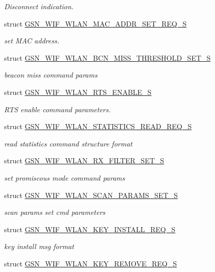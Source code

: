 \begin{DoxyCompactItemize}
\begin{DoxyCompactList}\small\item\em Disconnect indication. \end{DoxyCompactList}\item 
struct \hyperlink{a00388}{GSN\_\-WIF\_\-WLAN\_\-MAC\_\-ADDR\_\-SET\_\-REQ\_\-S}
\begin{DoxyCompactList}\small\item\em set MAC address. \end{DoxyCompactList}\item 
struct \hyperlink{a00372}{GSN\_\-WIF\_\-WLAN\_\-BCN\_\-MISS\_\-THRESHOLD\_\-SET\_\-S}
\begin{DoxyCompactList}\small\item\em beacon miss command params \end{DoxyCompactList}\item 
struct \hyperlink{a00396}{GSN\_\-WIF\_\-WLAN\_\-RTS\_\-ENABLE\_\-S}
\begin{DoxyCompactList}\small\item\em RTS enable command parameters. \end{DoxyCompactList}\item 
struct \hyperlink{a00406}{GSN\_\-WIF\_\-WLAN\_\-STATISTICS\_\-READ\_\-REQ\_\-S}
\begin{DoxyCompactList}\small\item\em read statistics command structure format \end{DoxyCompactList}\item 
struct \hyperlink{a00397}{GSN\_\-WIF\_\-WLAN\_\-RX\_\-FILTER\_\-SET\_\-S}
\begin{DoxyCompactList}\small\item\em set promiscous mode command params \end{DoxyCompactList}\item 
struct \hyperlink{a00401}{GSN\_\-WIF\_\-WLAN\_\-SCAN\_\-PARAMS\_\-SET\_\-S}
\begin{DoxyCompactList}\small\item\em scan params set cmd parameters \end{DoxyCompactList}\item 
struct \hyperlink{a00386}{GSN\_\-WIF\_\-WLAN\_\-KEY\_\-INSTALL\_\-REQ\_\-S}
\begin{DoxyCompactList}\small\item\em key install msg format \end{DoxyCompactList}\item 
struct \hyperlink{a00387}{GSN\_\-WIF\_\-WLAN\_\-KEY\_\-REMOVE\_\-REQ\_\-S}

\end{DoxyCompactItemize}
